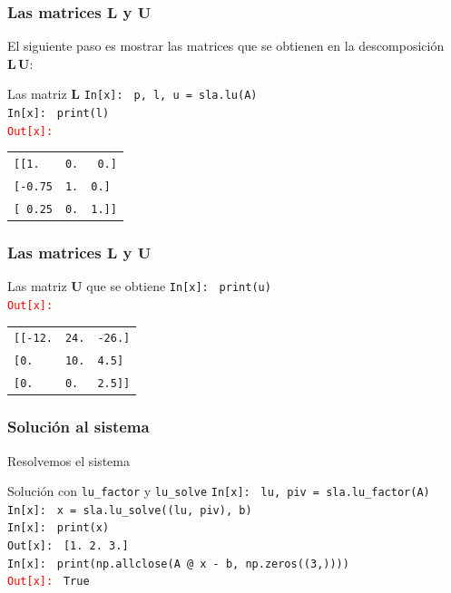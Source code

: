 \begin{frame}
\frametitle{Las matrices $\mathbf{L}$ y $\mathbf{U}$}
El siguiente paso es mostrar las matrices que se obtienen en la descomposición $\mathbf{L \, U}$:
\begin{exampleblock}{Las matriz $\mathbf{L}$}
\textcolor{ao}{\texttt{In[x]: }} \texttt{p, l, u = sla.lu(A)} \\
\medskip
\pause
\textcolor{ao}{\texttt{In[x]: }} \texttt{print(l)} \\
\medskip
\pause
\textcolor{red}{\texttt{Out[x]: }} 
\begin{flushleft}
\begin{tabular}{l l l}
\texttt{[[1.} & \texttt{0.} & \texttt{ 0.]} \\
\texttt{[-0.75} & \texttt{1.} & \texttt{0.]} \\
\texttt{[ 0.25} & \texttt{0.} & \texttt{1.]]}    
\end{tabular}
\end{flushleft}
\end{exampleblock}
\end{frame}
\begin{frame}
\frametitle{Las matrices $\mathbf{L}$ y $\mathbf{U}$}
\begin{exampleblock}{Las matriz $\mathbf{U}$ que se obtiene}
\textcolor{ao}{\texttt{In[x]: }} \texttt{print(u)} \\
\medskip
\pause
\textcolor{red}{\texttt{Out[x]: }} \\
\begin{flushleft}
\begin{tabular}{l l l}
\texttt{[[-12.} & \texttt{24.} & \texttt{-26.]} \\
\texttt{[0.} & \texttt{10.} & \texttt{4.5]} \\
\texttt{[0.} & \texttt{0.} & \texttt{2.5]]}    
\end{tabular}
\end{flushleft}
\end{exampleblock}
\end{frame}
\begin{frame}
\frametitle{Solución al sistema}
Resolvemos el sistema
\begin{exampleblock}{Solución con \texttt{lu\_factor} y \texttt{lu\_solve}}
\textcolor{ao}{\texttt{In[x]: }} \texttt{lu, piv = sla.lu\_factor(A)} \\
\medskip
\pause
\textcolor{ao}{\texttt{In[x]: }} \texttt{x = sla.lu\_solve((lu, piv), b)} \\
\medskip
\pause
\textcolor{ao}{\texttt{In[x]: }} \texttt{print(x)} \\
\medskip
\pause
\textcolor{ao}{\texttt{Out[x]: }} \texttt{[1. 2. 3.]} \\
\medskip
\pause
\textcolor{ao}{\texttt{In[x]: }} \texttt{print(np.allclose(A @ x - b, np.zeros((3,))))} \\
\medskip
\pause
\textcolor{red}{\texttt{Out[x]: }} \texttt{True}
\end{exampleblock}
\end{frame}
